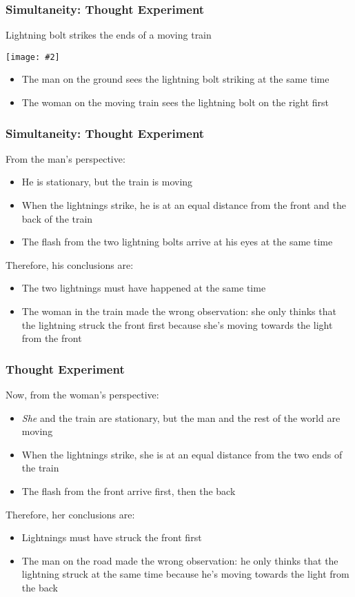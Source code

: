 \documentclass[12pt,compress,aspectratio=169]{beamer}
\newcommand{\pic}[2]{\texttt{[image: \#2]}}
\begin{document}
\begin{frame}
  \frametitle{Simultaneity: Thought Experiment}
  Lightning bolt strikes the ends of a moving train
  \begin{center}
    \pic{.5}{graphics/87-1-1024x673.png}
  \end{center}
  \vspace{-0.1in}
  \begin{itemize}
  \item The man on the ground sees the lightning bolt striking at the same time
  \item The woman on the moving train sees the lightning bolt on the right first
  \end{itemize}
\end{frame}

\begin{frame}
  \frametitle{Simultaneity: Thought Experiment}
  From the man's perspective:
  \begin{itemize}
  \item He is stationary, but the train is moving
  \item When the lightnings strike, he is at an equal distance from the front
    and the back of the train
  \item The flash from the two lightning bolts arrive at his eyes at the same
    time
  \end{itemize}
  Therefore, his conclusions are:
  \begin{itemize}
  \item The two lightnings must have happened at the same time
  \item The woman in the train made the wrong observation: she only thinks that
    the lightning struck the front first because she's moving towards the light
    from the front
  \end{itemize}
\end{frame}


\begin{frame}
  \frametitle{Thought Experiment}
  Now, from the woman's perspective:
  \begin{itemize}
  \item\emph{She} and the train are stationary, but the man and the rest of the
    world are moving
  \item When the lightnings strike, she is at an equal distance from the two
    ends of the train
  \item The flash from the front arrive first, then the back
  \end{itemize}
  Therefore, her conclusions are:
  \begin{itemize}
  \item Lightnings must have struck the front first
  \item The man on the road made the wrong observation: he only thinks that
    the lightning struck at the same time because he's moving towards the light
    from the back
  \end{itemize}
\end{frame}
\end{document}
